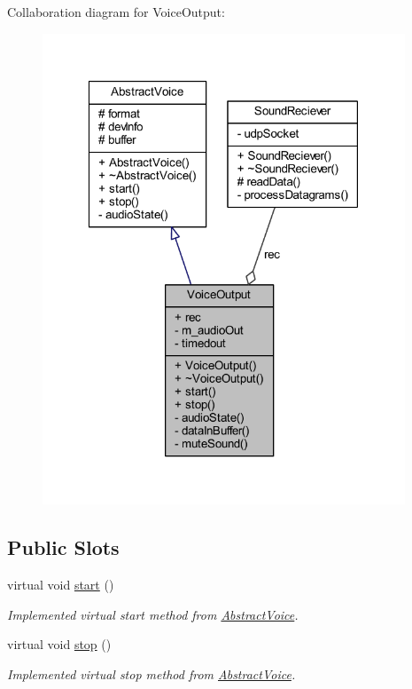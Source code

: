 \-Collaboration diagram for \-Voice\-Output\-:\nopagebreak
\begin{figure}[H]
\begin{center}
\leavevmode
\includegraphics[width=307pt]{class_voice_output__coll__graph}
\end{center}
\end{figure}
\subsection*{\-Public \-Slots}
\begin{DoxyCompactItemize}
\item 
virtual void \hyperlink{class_voice_output_ab73d7fc81805b8ba0d457db2fcf29ac4}{start} ()
\begin{DoxyCompactList}\small\item\em \-Implemented virtual start method from \hyperlink{class_abstract_voice}{\-Abstract\-Voice}. \end{DoxyCompactList}\item 
virtual void \hyperlink{class_voice_output_ad86ffb5732b221da79f5bfba04e7a35a}{stop} ()
\begin{DoxyCompactList}\small\item\em \-Implemented virtual stop method from \hyperlink{class_abstract_voice}{\-Abstract\-Voice}. \end{DoxyCompactList}\end{DoxyCompactItemize}
